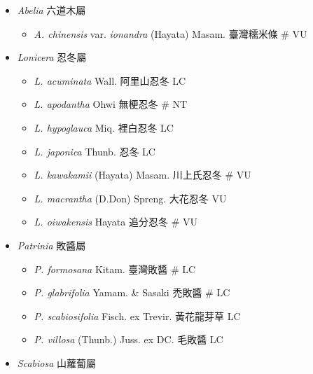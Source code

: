 
  \begin{itemize}
 \item[] \textit{Abelia} 六道木屬
                                
  \begin{itemize}
        \item[] \textit{A. chinensis} var. \textit{ionandra} (Hayata) Masam.  臺灣糯米條  \# VU
  \end{itemize}
 \item[] \textit{Lonicera} 忍冬屬
                                
  \begin{itemize}
        \item[] \textit{L. acuminata} Wall.  阿里山忍冬   LC
        \item[] \textit{L. apodantha} Ohwi  無梗忍冬  \# NT
        \item[] \textit{L. hypoglauca} Miq.  裡白忍冬   LC
        \item[] \textit{L. japonica} Thunb.  忍冬   LC
        \item[] \textit{L. kawakamii} (Hayata) Masam.  川上氏忍冬  \# VU
        \item[] \textit{L. macrantha} (D.Don) Spreng.  大花忍冬   VU
        \item[] \textit{L. oiwakensis} Hayata  追分忍冬  \# VU
  \end{itemize}
 \item[] \textit{Patrinia} 敗醬屬
                                
  \begin{itemize}
        \item[] \textit{P. formosana} Kitam.  臺灣敗醬  \# LC
        \item[] \textit{P. glabrifolia} Yamam. \& Sasaki  禿敗醬  \# LC
        \item[] \textit{P. scabiosifolia} Fisch. ex Trevir.  黃花龍芽草   LC
        \item[] \textit{P. villosa} (Thunb.) Juss. ex DC.  毛敗醬   LC
  \end{itemize}
 \item[] \textit{Scabiosa} 山蘿蔔屬
                                

\end{itemize}
